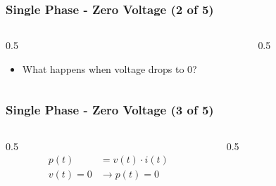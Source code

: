 \begin{frame}
    \frametitle{Single Phase - Zero Voltage (2 of 5)}

    \begin{columns}
        \begin{column}{0.5\linewidth}
            \begin{itemize}
                \item{What happens when voltage drops to 0?}
            \end{itemize}
        \end{column}
        \begin{column}{0.5\linewidth}
            \begin{figure}
                \centering
                \resizebox{\columnwidth}{!}{
                    
                }
            \end{figure}
        \end{column}
    \end{columns}
\end{frame}

\begin{frame}
    \frametitle{Single Phase - Zero Voltage (3 of 5)}

    \begin{columns}
        \begin{column}{0.5\linewidth}
            \[            
                \begin{aligned}
                    p(t) &= v(t) \cdot i(t) \\
                    v(t) = 0 &\rightarrow p(t) = 0
                \end{aligned}
            \]
        \end{column}
        \begin{column}{0.5\linewidth}
            \begin{figure}
                \centering
                \resizebox{\columnwidth}{!}{
                    
                }
            \end{figure}
        \end{column}
    \end{columns}
\end{frame}

